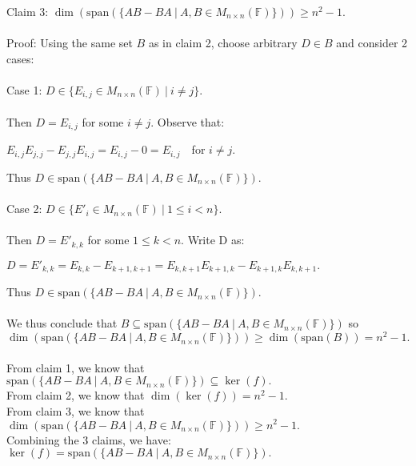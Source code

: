 \documentclass{article}
\begin{document}
Claim 3: $\dim(\text{span}(\{AB-BA\ |\ A,B\in M_{n\times n}(\mathbb{F})\})) \geq n^2 -1.$\\\\
Proof: Using the same set $B$ as in claim 2, choose arbitrary $D \in B$ and consider 2 cases:\\\\
Case 1: $D \in \{E_{i,j} \in M_{n\times n}(\mathbb{F})\ | \ i \neq j\}.$\\\\
Then $D = E_{i,j}$ for some $i \neq j.$ Observe that: \begin{center}
    
$E_{i,j}E_{j,j} - E_{j,j}E_{i,j} = E_{i,j} - 0 = E_{i,j}$\ \ for $i\neq j.$  \end{center} Thus $D \in \text{span}(\{AB-BA \ | \ A,B\in M_{n\times n} (\mathbb{F})\}).$\\\\
Case 2: $D\in \{E'_i \in M_{n\times n}(\mathbb{F}) \ | \ 1 \leq i < n \}$.\\\\
Then $D = E'_{k,k}$ for some $1\leq k < n.$ Write D as:\begin{center}
    $D = E'_{k,k} = E_{k,k} - E_{k+1,k+1} = E_{k,k+1}E_{k+1,k} - E_{k+1,k}E_{k,k+1}.$
\end{center}
Thus $D \in \text{span}(\{AB-BA \ | \ A,B\in M_{n\times n} (\mathbb{F})\}).$\\\\
We thus conclude that $B \subseteq \text{span}(\{AB-BA \ | \ A,B\in M_{n\times n} (\mathbb{F})\})$ so\\ $\dim(\text{span}(\{AB-BA \ | \ A,B\in M_{n\times n} (\mathbb{F})\})) \geq \dim(\text{span}(B)) = n^2 - 1.$\\\\
From claim 1, we know that $\text{span}(\{AB-BA \ | \ A,B\in M_{n\times n} (\mathbb{F})\})\subseteq \ker(f).$\\
From claim 2, we know that $\dim(\ker(f)) = n^2-1.$\\
From claim 3, we know that $\dim(\text{span}(\{AB-BA \ | \ A,B\in M_{n\times n} (\mathbb{F})\})) \geq n^2 - 1.$\\
Combining the 3 claims, we have: $\ker(f) = \text{span}(\{AB-BA \ | \ A,B\in M_{n\times n} (\mathbb{F})\}).$
\end{document}
